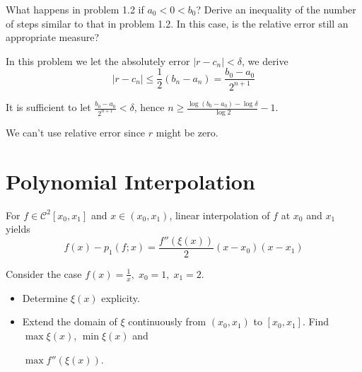\documentclass[11pt]{elegantbook}
\begin{document}
\vspace{1.5em}

\begin{problem}
  What happens in problem 1.2 if $a_0<0<b_0$? Derive an inequality of the number of steps similar to that in problem 1.2. In this case, is the relative error still an appropriate measure?
\end{problem}

\begin{solution}
  In this problem we let the absolutely error $|r-c_n|<\delta$, we derive
  \begin{equation}
    |r-c_n| \leq \frac{1}{2}(b_n-a_n) = \frac{b_0-a_0}{2^{n+1}}
  \end{equation}

  It is sufficient to let $\frac{b_0-a_0}{2^{n+1}}<\delta$, hence $n\geq \frac{\log(b_0-a_0)-\log \delta}{\log 2}-1$.

  We can't use relative error since $r$ might be zero.
\end{solution}

\chapter{Polynomial Interpolation}

\begin{problem}
  For $f\in\mathcal{C}^2[x_0,x_1]$ and $x\in(x_0,x_1)$, linear interpolation of $f$ at $x_0$ and $x_1$ yields
  \begin{equation}
    f(x)-p_1(f;x) = \frac{f''(\xi(x))}{2}(x-x_0)(x-x_1)
  \end{equation}

  Consider the case $f(x)=\frac{1}{x},\;x_0=1,\;x_1=2$.
  \begin{itemize}
    \item Determine $\xi(x)$ explicity.
    \item Extend the domain of $\xi$ continuously from $(x_0,x_1)$ to $[x_0,x_1]$. Find $\max \xi(x)$, $\min \xi(x)$ and
    
    $\max f''(\xi(x))$.
  \end{itemize}
\end{problem}
\end{document}
